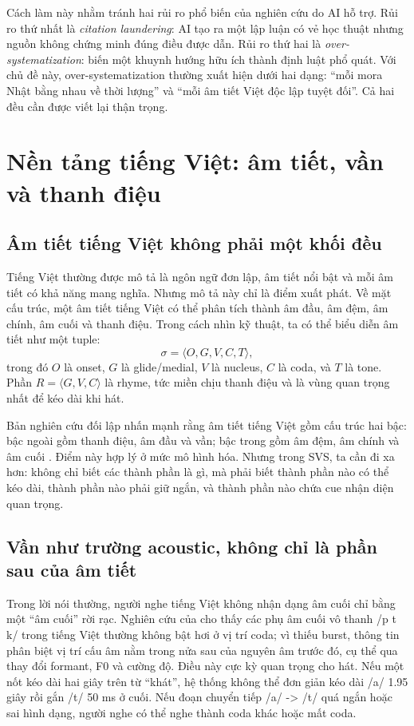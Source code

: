\documentclass[12pt,a4paper]{article}
\newcommand{\term}[1]{\textit{#1}}
\begin{document}
Cách làm này nhằm tránh hai rủi ro phổ biến của nghiên cứu do AI hỗ trợ. Rủi ro thứ nhất là 
\term{citation laundering}: AI tạo ra một lập luận có vẻ học thuật nhưng nguồn không chứng minh đúng điều được dẫn. Rủi ro thứ hai là 
\term{over-systematization}: biến một khuynh hướng hữu ích thành định luật phổ quát. Với chủ đề này, over-systematization thường xuất hiện dưới hai dạng: 
\enquote{mỗi mora Nhật bằng nhau về thời lượng} và 
\enquote{mỗi âm tiết Việt độc lập tuyệt đối}. Cả hai đều cần được viết lại thận trọng.

\section{Nền tảng tiếng Việt: âm tiết, vần và thanh điệu}

\subsection{Âm tiết tiếng Việt không phải một khối đều}

Tiếng Việt thường được mô tả là ngôn ngữ đơn lập, âm tiết nổi bật và mỗi âm tiết có khả năng mang nghĩa. Nhưng mô tả này chỉ là điểm xuất phát. Về mặt cấu trúc, một âm tiết tiếng Việt có thể phân tích thành âm đầu, âm đệm, âm chính, âm cuối và thanh điệu. Trong cách nhìn kỹ thuật, ta có thể biểu diễn âm tiết như một tuple:
\[
\sigma = \langle O, G, V, C, T \rangle,
\]
trong đó $O$ là onset, $G$ là glide/medial, $V$ là nucleus, $C$ là coda, và $T$ là tone. Phần $R = \langle G,V,C\rangle$ là rhyme, tức miền chịu thanh điệu và là vùng quan trọng nhất để kéo dài khi hát.

Bản nghiên cứu đối lập nhấn mạnh rằng âm tiết tiếng Việt gồm cấu trúc hai bậc: bậc ngoài gồm thanh điệu, âm đầu và vần; bậc trong gồm âm đệm, âm chính và âm cuối \parencite{opposingResearch2026}. Điểm này hợp lý ở mức mô hình hóa. Nhưng trong SVS, ta cần đi xa hơn: không chỉ biết các thành phần là gì, mà phải biết thành phần nào có thể kéo dài, thành phần nào phải giữ ngắn, và thành phần nào chứa cue nhận diện quan trọng.

\subsection{Vần như trường acoustic, không chỉ là phần sau của âm tiết}

Trong lời nói thường, người nghe tiếng Việt không nhận dạng âm cuối chỉ bằng một 
\enquote{âm cuối} rời rạc. Nghiên cứu của \textcite{tran2019vietnameseCoda} cho thấy các phụ âm cuối vô thanh /p t k/ trong tiếng Việt thường không bật hơi ở vị trí coda; vì thiếu burst, thông tin phân biệt vị trí cấu âm nằm trong nửa sau của nguyên âm trước đó, cụ thể qua thay đổi formant, F0 và cường độ. Điều này cực kỳ quan trọng cho hát. Nếu một nốt kéo dài hai giây trên từ 
\enquote{khát}, hệ thống không thể đơn giản kéo dài /a/ 1.95 giây rồi gắn /t/ 50 ms ở cuối. Nếu đoạn chuyển tiếp /a/ -> /t/ quá ngắn hoặc sai hình dạng, người nghe có thể nghe thành coda khác hoặc mất coda.
\end{document}
